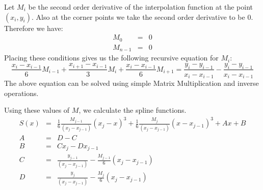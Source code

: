 \documentclass[12,a4paper]{article}
\begin{document}
   Let $M_i$ be the second order derivative of the interpolation function at the point $(x_i,y_i)$. Also at the corner points we take the second order derivative to be 0. Therefore we have:
   \begin{eqnarray}
       \nonumber
       M_0 &=& 0 \nonumber \\
       M_{n-1} &=& 0\nonumber
   \end{eqnarray}
   Placing these conditions gives us the following recursive equation for $M_i$:
   \begin{equation}
        \nonumber
        \frac{x_i - x_{i-1}}{6}M_{i-1} + \frac{x_{i+1} - x_{i-1}}{3}M_{i} + \frac{x_i - x_{i-1}}{6}M_{i+1} = \frac{y_{i}-y_{i-1}}{x_{i}-x_{i-1}} - \frac{y_{i}-y_{i-1}}{x_{i}-x_{i-1}}
   \end{equation}
   The above equation can be solved using simple Matrix Multiplication and inverse operations.
   
   Using these values of $M$, we calculate the spline functions.
   \begin{eqnarray*}
        S(x) &=& \frac{1}{6}\frac{M_{j-1}}{(x_j - x_{j-1})}(x_j - x)^3 + \frac{1}{6}\frac{M_{j}}{(x_j - x_{j-1})}(x - x_{j-1})^3 + Ax + B\\
        A &=& D - C\\
        B &=& Cx_j - Dx_{j-1}\\
        C &=& \frac{y_{j-1}}{(x_j - x_{j-1})} - \frac{M_{j-1}}{6}(x_j - x_{j-1})\\
        D &=& \frac{y_j}{(x_j - x_{j-1})} - \frac{M_{j}}{6}(x_j - x_{j-1})\\
   \end{eqnarray*}
   
\end{document}
